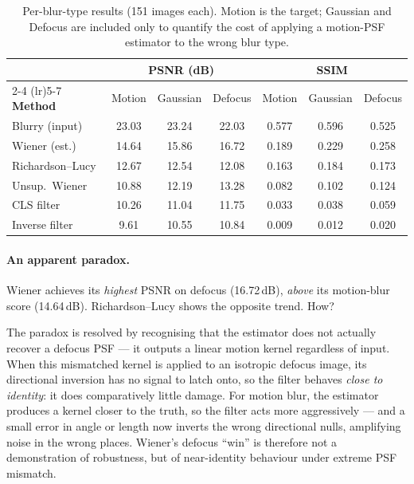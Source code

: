 \documentclass[12pt,a4paper]{article}
\begin{document}
\begin{table}[H]
\centering
\begin{tabular}{l ccc ccc}
\toprule
 & \multicolumn{3}{c}{\textbf{PSNR (dB)}} & \multicolumn{3}{c}{\textbf{SSIM}} \\
\cmidrule(lr){2-4} \cmidrule(lr){5-7}
\textbf{Method} & Motion & Gaussian & Defocus & Motion & Gaussian & Defocus \\
\midrule
Blurry (input)    & 23.03 & 23.24 & 22.03 & 0.577 & 0.596 & 0.525 \\
Wiener (est.)     & 14.64 & 15.86 & 16.72 & 0.189 & 0.229 & 0.258 \\
Richardson--Lucy  & 12.67 & 12.54 & 12.08 & 0.163 & 0.184 & 0.173 \\
Unsup.\ Wiener    & 10.88 & 12.19 & 13.28 & 0.082 & 0.102 & 0.124 \\
CLS filter        & 10.26 & 11.04 & 11.75 & 0.033 & 0.038 & 0.059 \\
Inverse filter    &  9.61 & 10.55 & 10.84 & 0.009 & 0.012 & 0.020 \\
\bottomrule
\end{tabular}
\caption{Per-blur-type results (151 images each). Motion is the target; Gaussian and Defocus are included only to quantify the cost of applying a motion-PSF estimator to the wrong blur type.}
\label{tab:pertype}
\end{table}

\paragraph{An apparent paradox.} Wiener achieves its \textit{highest}
PSNR on defocus (16.72\,dB), \textit{above} its motion-blur score
(14.64\,dB). Richardson--Lucy shows the opposite trend. How?

The paradox is resolved by recognising that the estimator does not
actually recover a defocus PSF --- it outputs a linear motion kernel
regardless of input. When this mismatched kernel is applied to an
isotropic defocus image, its directional inversion has no signal to
latch onto, so the filter behaves \textit{close to identity}: it does
comparatively little damage. For motion blur, the estimator produces a
kernel closer to the truth, so the filter acts more aggressively ---
and a small error in angle or length now inverts the wrong directional
nulls, amplifying noise in the wrong places. Wiener's defocus
``win'' is therefore not a demonstration of robustness, but of
near-identity behaviour under extreme PSF mismatch.
\end{document}
